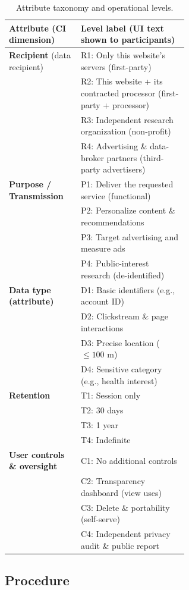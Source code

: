 \documentclass{eusset}
\begin{document}
\begin{table}[ht]
    \begin{tabular}{l p{0.6\linewidth}} 
    \textbf{Attribute (CI dimension)} & \textbf{Level label (UI text shown to participants)} \\
    \hline
    \textbf{Recipient} (data recipient) &
    R1: Only this website's servers (first-party) \\
    & R2: This website + its contracted processor (first-party + processor) \\
    & R3: Independent research organization (non-profit) \\
    & R4: Advertising \& data-broker partners (third-party advertisers) \\
    \hline
    \textbf{Purpose / Transmission} &
    P1: Deliver the requested service (functional) \\
    & P2: Personalize content \& recommendations \\
    & P3: Target advertising and measure ads \\
    & P4: Public-interest research (de-identified) \\
    \hline
    \textbf{Data type (attribute)} &
    D1: Basic identifiers (e.g., account ID) \\
    & D2: Clickstream \& page interactions \\
    & D3: Precise location (\(\le 100\) m) \\
    & D4: Sensitive category (e.g., health interest) \\
    \hline
    \textbf{Retention} &
    T1: Session only \\
    & T2: 30 days \\
    & T3: 1 year \\
    & T4: Indefinite \\
    \hline
    \textbf{User controls \& oversight} &
    C1: No additional controls \\
    & C2: Transparency dashboard (view uses) \\
    & C3: Delete \& portability (self-serve) \\
    & C4: Independent privacy audit \& public report \\
  \end{tabular}
  \caption{Attribute taxonomy and operational levels.}
  \label{tab:attributes}
\end{table}

\subsection{Procedure}
\end{document}
